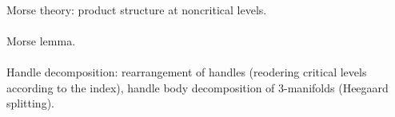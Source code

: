 \documentclass{article}
\begin{document}
\paragraph{}
Morse theory:
product structure at noncritical levels.


\paragraph{}
Morse lemma.


\paragraph{} Handle decomposition: rearrangement of handles (reodering critical levels according to the index), handle body decomposition of 3-manifolds (Heegaard splitting).

\end{document}

